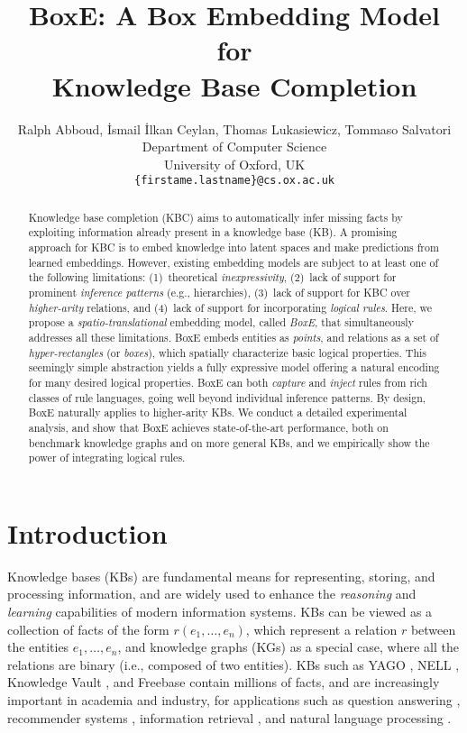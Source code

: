 \documentclass{article}
\title{BoxE: A Box Embedding Model for\\ Knowledge Base Completion}
\author{Ralph Abboud, {\.I}smail {\.I}lkan Ceylan, Thomas Lukasiewicz, Tommaso Salvatori \\
  Department of Computer Science\\
  University of Oxford, UK\\
  \texttt{\{firstame.lastname\}@cs.ox.ac.uk} \\
}
\begin{document}
\maketitle

\begin{abstract}
Knowledge base completion (KBC) aims to automatically infer missing facts by exploiting information already present in a knowledge base (KB). A promising approach for KBC is to embed knowledge into latent spaces and make predictions from learned embeddings.
However, existing embedding models are subject to at least one of the following limitations: (1)~theoretical \emph{inexpressivity}, (2)~lack of support for prominent \emph{inference patterns} (e.g., hierarchies), (3)~lack of support for KBC over \emph{higher-arity} relations, and (4)~lack of support for incorporating \emph{logical rules}. 
Here, we propose  a \emph{spatio-translational} embedding model, 
called \emph{BoxE}, that simultaneously addresses  all these limitations. BoxE embeds entities as \emph{points}, and relations as a set of \emph{hyper-rectangles} (or \emph{boxes}), which spatially characterize basic logical properties. 
This seemingly simple abstraction yields a fully expressive model offering a natural encoding for many desired logical properties. BoxE can both \emph{capture} and \emph{inject} rules from rich classes  of rule languages, going well beyond individual inference patterns. 
By design, BoxE naturally applies to higher-arity KBs. 
We conduct a detailed experimental analysis, and show that BoxE achieves state-of-the-art performance, both on benchmark knowledge graphs and on more general KBs, and we empirically show the power of integrating logical rules. 
\end{abstract}
\section{Introduction}

Knowledge bases (KBs) are fundamental means for {representing}, {storing}, and {processing} information, and are widely used to enhance the \emph{reasoning} and \emph{learning} capabilities of modern information systems.
KBs can be viewed as a collection of facts of the form $r(e_1, \ldots,e_n)$, which represent a relation $r$ between the entities $e_1, \ldots, e_n$, and {knowledge graphs (KGs)} as a special case, where all the relations are binary (i.e., composed of two entities).
KBs such as YAGO \cite{MahdisoltaniBS15}, NELL \cite{MitchellBCM18}, Knowledge Vault \cite{GoogleVault}, and Freebase \cite{BollackerCT07} contain millions of facts, and are increasingly important in academia and industry, for applications such as question answering \cite{BordesCW14}, recommender systems \cite{WangZWZLXG18}, information retrieval \cite{XiongPC17}, and natural language processing \cite{YangM17}. 
\end{document}
